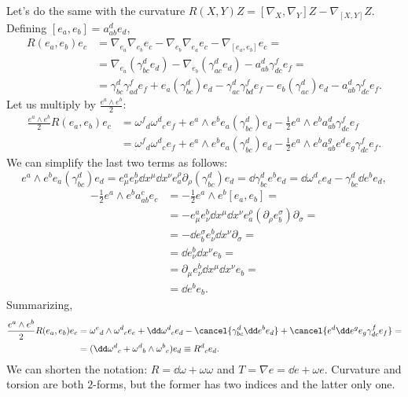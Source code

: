 \documentclass[a4paper,12pt]{book}
\begin{document}
Let's do the same with the curvature $R(X,Y)Z=[\nabla_X,\nabla_Y]Z-\nabla_{[X,Y]}Z$. Defining $[e_a,e_b]=a_{ab}^de_d$,
\begin{align*}
R(e_a,e_b)e_c&=\nabla_{e_a}\nabla_{e_b}e_c-\nabla_{e_b}\nabla_{e_a}e_c-\nabla_{[e_a,e_b]}e_c=\\
&=\nabla_{e_a}(\gamma_{bc}^de_d)-\nabla_{e_b}(\gamma_{ac}^de_d)-a_{ab}^d\gamma_{dc}^fe_f=\\
&=\gamma_{bc}^d\gamma_{ad}^fe_f+e_a(\gamma_{bc}^d)e_d-\gamma_{ac}^d\gamma_{bd}^fe_f-e_b(\gamma_{ac}^d)e_d-a_{ab}^d\gamma_{dc}^fe_f.
\end{align*}
Let us multiply by $\frac{e^a\wedge e^b}{2}$:
\begin{align*}
\frac{e^a\wedge e^b}{2}R(e_a,e_b)e_c&=\omega^f{}_d\omega^d{}_ce_f+e^a\wedge e^b e_a(\gamma_{bc}^d)e_d-\frac{1}{2}e^a\wedge e^b a_{ab}^d\gamma_{dc}^fe_f\\
&=\omega^f{}_d\omega^d{}_ce_f+e^a\wedge e^b e_a(\gamma_{bc}^d)e_d-\frac{1}{2}e^a\wedge e^b a_{ab}^ge^de_g\gamma_{dc}^fe_f.
\end{align*}
We can simplify the last two terms as follows:
\[e^a\wedge e^b e_a(\gamma_{bc}^d)e_d=e_\mu^ae_\nu^b\dd x^\mu\dd x^\nu e^\rho_a\partial_\rho(\gamma_{bc}^d)e_d=\dd\gamma_{bc}^de^be_d=\dd\omega^d{}_ce_d-\gamma_{bc}^d\dd e^be_d,\]
\begin{align*}
-\frac{1}{2}e^a\wedge e^b a_{ab}^c e_c&=-\frac{1}{2}e^a\wedge e^b[e_a,e_b]=\\
&=-e_\mu^ae_\nu^b\dd x^\mu\dd x^\nu e^\rho_a(\partial_\rho e^\sigma_b)\partial_\sigma=\\
&=-\dd e^\sigma_be^b_\nu\dd x^\nu\partial_\sigma=\\
&=\dd e^b_\nu\dd x^\nu e_b=\\
&=\partial_\mu e^b_\nu\dd x^\mu\dd x^\nu e_b=\\
&=\dd e^b e_b.
\end{align*}
Summarizing,
\begin{align*}
\frac{e^a\wedge e^b}{2}R(e_a,e_b)e_c&=\omega^e{}_d\wedge\omega^d{}_ce_e+\dd\omega^d{}_ce_d-\cancel{\gamma_{bc}^d\dd e^be_d}+\cancel{e^d\dd e^ge_g\gamma_{dc}^fe_f}=\\
&=(\dd\omega^d{}_c+\omega^d{}_b\wedge\omega^b{}_c)e_d\equiv R^d{}_ce_d.
\end{align*}
We can shorten the notation: $R=\dd\omega+\omega\omega$ and $T=\nabla e=\dd e+\omega e$. Curvature and torsion are both $2$-forms, but the former has two indices and the latter only one.
\end{document}
